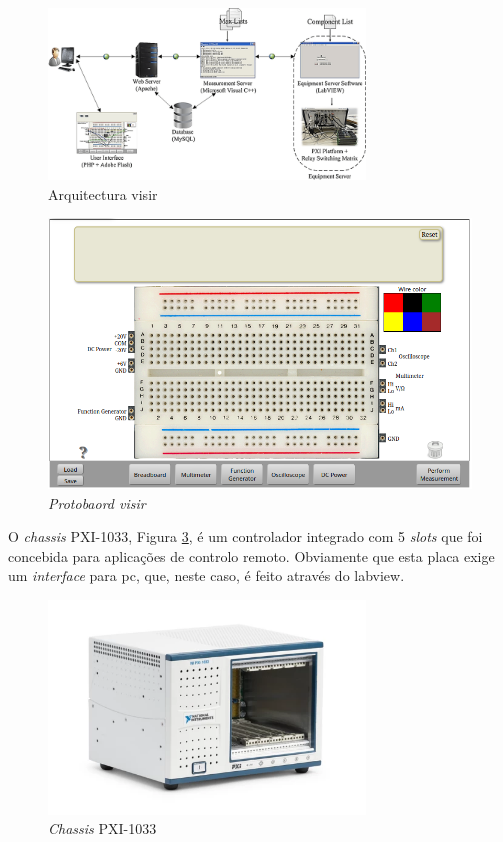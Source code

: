 \begin{figure}[hbtp]
    \centering
    \includegraphics[width=0.75\textwidth]{figures/arquitectura_VISIR.png}
    \caption{Arquitectura \acrshort{visir}\cite{tawfikexperiences}}
    \label{fig:arquitecturavisir}
\end{figure}

\begin{figure}[hbtp]
    \centering
    \includegraphics[width=0.75\linewidth]{figures/protboard_visir.png}
    \caption{\textit{Protobaord \acrshort{visir}}}
    \label{fig:protboard_visir}
\end{figure}

O \textit{chassis}  PXI-1033\cite{PXI-1033}, Figura \ref{fig:PXI-1033}, é um controlador integrado com 5 \textit{slots} que foi concebida para aplicações de controlo remoto. Obviamente que esta placa exige um \textit{interface} para \acrshort{pc}, que, neste caso, é feito através do \acrshort{labview}.

\begin{figure}[hbtp]
    \centering
    \includegraphics[width=0.75\textwidth]{figures/PXI-1033.png}
    \caption{\textit{Chassis} PXI-1033 \cite{PXI-1033}}
    \label{fig:PXI-1033}
\end{figure}

